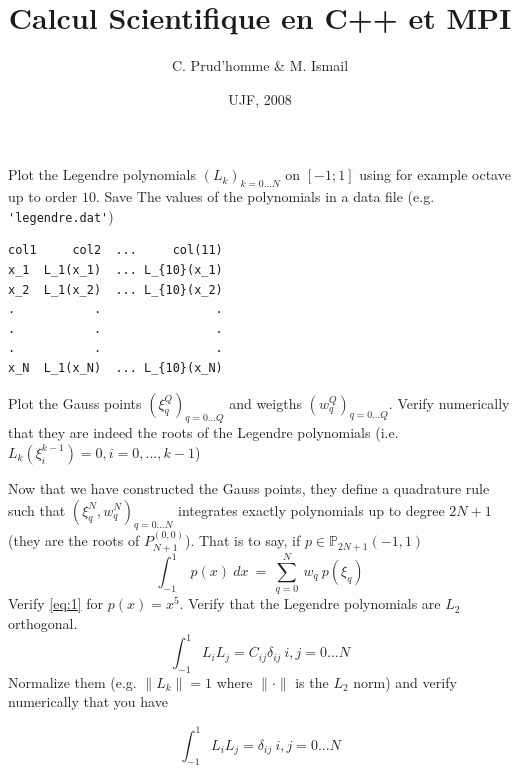 \documentclass{article}
\title{Calcul Scientifique en C++ et MPI}
\author{C. Prud'homme \& M. Ismail}
\date{UJF, 2008}
\begin{document}
\maketitle



\begin{Exercise}[title={p type Galerkin method in 1D}]

  \Question Plot the Legendre polynomials $(L_k)_{k=0...N}$ on
  $[-1;1]$ using for example octave up to order $10$. Save The values
  of the polynomials in a data file (e.g. \verb+'legendre.dat'+)
\begin{verbatim}
col1     col2  ...     col(11)
x_1  L_1(x_1)  ... L_{10}(x_1)
x_2  L_1(x_2)  ... L_{10}(x_2)
.           .                .
.           .                .
.           .                .
x_N  L_1(x_N)  ... L_{10}(x_N)
\end{verbatim}

  \Question Plot the Gauss points $(\xi^Q_q)_{q=0...Q}$ and weigths
  $(w^Q_q)_{q=0...Q}$. Verify numerically that they are indeed the roots
  of the Legendre polynomials (i.e. $L_k(\xi^{k-1}_i) = 0, i = 0,...,k-1$)

  \Question Now that we have constructed the Gauss points, they define
  a quadrature rule such that $(\xi^N_q,w^N_q)_{q=0...N}$ integrates
  exactly polynomials up to degree $2N+1$ (they are the roots of
  $P^{(0,0)}_{N+1}$). That is to say, if $p \in \mathbb{P}_{2N+1}(-1,1)$
  \begin{equation}
    \label{eq:1}
    \int_{-1}^1\ p(x)\ dx\ =\ \sum_{q=0}^{N}\ w_q\ p( \xi_q )
  \end{equation}
  \subQuestion Verify \eqref{eq:1} for $p(x)=x^5$.
  \subQuestion Verify that the Legendre polynomials are $L_2$ orthogonal.
  \begin{equation}
    \label{eq:3}
    \int_{-1}^1 L_i L_j = C_{ij} \delta_{ij}\ i,j=0...N
  \end{equation}
  \subQuestion Normalize them (e.g. $\|L_k\| = 1$ where $\|\cdot\|$ is the
  $L_2$ norm) and verify numerically that you have

  \begin{equation}
    \label{eq:2}
    \int_{-1}^1 L_i L_j =  \delta_{ij}\ i,j=0...N
  \end{equation}


\end{Exercise}
\end{document}
